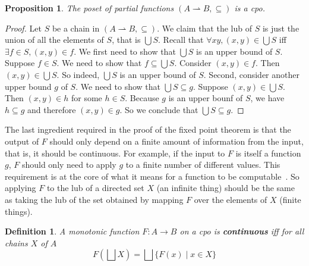 \documentclass{tufte-handout}
\newtheorem{proposition}[theorem]{Proposition}
\newtheorem{definition}{Definition}%
\begin{document}

\begin{proposition}
  The poset of partial functions $(A\rightharpoonup B,\subseteq)$ is a
  cpo.
\end{proposition}
\begin{proof}
  Let $S$ be a chain in $(A\rightharpoonup B,\subseteq)$.  We claim
  that the lub of $S$ is just the union of all the elements of $S$,
  that is $\bigcup S$. Recall that $\forall x y, (x,y) \in \bigcup S$
  iff $\exists f \in S, (x,y) \in f$.
%
  We first need to show that $\bigcup S$ is an upper bound of $S$.
  Suppose $f \in S$. We need to show that $f \subseteq \bigcup S$.
  Consider $(x,y) \in f$. Then $(x,y) \in \bigcup S$. So indeed,
  $\bigcup S$ is an upper bound of $S$.  Second, consider another
  upper bound $g$ of $S$.  We need to show that $\bigcup S \subseteq
  g$. Suppose $(x,y) \in \bigcup S$.  Then $(x,y) \in h$ for some $h
  \in S$. Because $g$ is an upper bounf of $S$, we have $h \subseteq
  g$ and therefore $(x,y) \in g$. So we conclude that $\bigcup S
  \subseteq g$.
\end{proof}

The last ingredient required in the proof of the fixed point theorem
is that the output of $F$ should only depend on a finite amount of
information from the input, that is, it should be continuous. For
example, if the input to $F$ is itself a function $g$, $F$ should only
need to apply $g$ to a finite number of different values.  This
requirement is at the core of what it means for a function to be
computable~\citep{Gunter:1990aa}.  So applying $F$ to the lub of a
directed set $X$ (an infinite thing) should be the same as taking the
lub of the set obtained by mapping $F$ over the elements of $X$
(finite things).

\begin{definition}
  A monotonic function $F : A {\to} B$ on a cpo is
  \textbf{\emph{continuous}} iff for all chains $X$ of $A$
  \[
  F(\bigsqcup X) = \bigsqcup \{ F(x) \mid x \in X \}
  \]
\end{definition}
\end{document}
